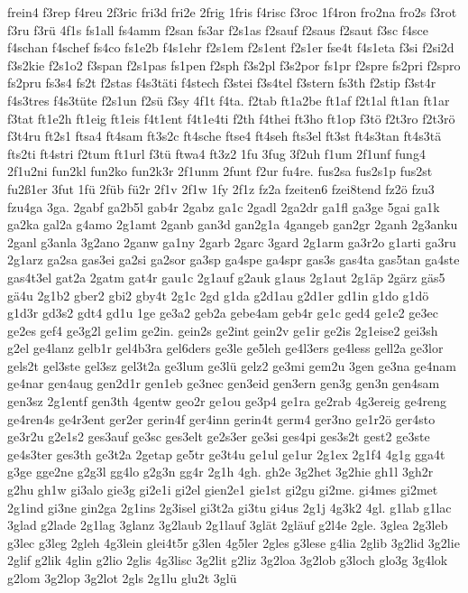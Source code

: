 {frein4
f3rep
f4reu
2f3ric
fri3d
fri2e
2frig
1fris
f4risc
f3roc
1f4ron
fro2na
fro2s
f3rot
f3ru
f3rü
4f1s
fs1all
fs4amm
f2san
fs3ar
f2s1as
f2sauf
f2saus
f2saut
f3sc
f4sce
f4schan
f4schef
fs4co
fs1e2b
f4s1ehr
f2s1em
f2s1ent
f2s1er
fse4t
f4s1eta
f3si
f2si2d
f3s2kie
f2s1o2
f3span
f2s1pas
fs1pen
f2sph
f3s2pl
f3s2por
fs1pr
f2spre
fs2pri
f2spro
fs2pru
fs3s4
fs2t
f2stas
f4s3täti
f4stech
f3stei
f3s4tel
f3stern
fs3th
f2stip
f3st4r
f4s3tres
f4s3tüte
f2s1un
f2sü
f3sy
4f1t
f4ta.
f2tab
ft1a2be
ft1af
f2t1al
ft1an
ft1ar
f3tat
ft1e2h
ft1eig
ft1eis
f4t1ent
f4t1e4ti
f2th
f4thei
ft3ho
ft1op
f3tö
f2t3ro
f2t3rö
f3t4ru
ft2s1
ftsa4
ft4sam
ft3s2c
ft4sche
ftse4
ft4seh
fts3el
ft3st
ft4s3tan
ft4s3tä
fts2ti
ft4stri
f2tum
ft1url
f3tü
ftwa4
ft3z2
1fu
3fug
3f2uh
f1um
2f1unf
fung4
2f1u2ni
fun2kl
fun2ko
fun2k3r
2f1unm
2funt
f2ur
fu4re.
fus2sa
fus2s1p
fus2st
fu2ß1er
3fut
1fü
2füb
fü2r
2f1v
2f1w
1fy
2f1z
fz2a
fzeiten6
fzei8tend
fz2ö
fzu3
fzu4ga
3ga.
2gabf
ga2b5l
gab4r
2gabz
ga1c
2gadl
2ga2dr
ga1fl
ga3ge
5gai
ga1k
ga2ka
gal2a
g4amo
2g1amt
2ganb
gan3d
gan2g1a
4gangeb
gan2gr
2ganh
2g3anku
2ganl
g3anla
3g2ano
2ganw
ga1ny
2garb
2garc
3gard
2g1arm
ga3r2o
g1arti
ga3ru
2g1arz
ga2sa
gas3ei
ga2si
ga2sor
ga3sp
ga4spe
ga4spr
gas3s
gas4ta
gas5tan
ga4ste
gas4t3el
gat2a
2gatm
gat4r
gau1c
2g1auf
g2auk
g1aus
2g1aut
2g1äp
2gärz
gäs5
gä4u
2g1b2
gber2
gbi2
gby4t
2g1c
2gd
g1da
g2d1au
g2d1er
gd1in
g1do
g1dö
g1d3r
gd3s2
gdt4
gd1u
1ge
ge3a2
geb2a
gebe4am
geb4r
ge1c
ged4
ge1e2
ge3ec
ge2es
gef4
ge3g2l
ge1im
ge2in.
gein2s
ge2int
gein2v
ge1ir
ge2is
2g1eise2
gei3sh
g2el
ge4lanz
gelb1r
gel4b3ra
gel6ders
ge3le
ge5leh
ge4l3ers
ge4less
gell2a
ge3lor
gels2t
gel3ste
gel3sz
gel3t2a
ge3lum
ge3lü
gelz2
ge3mi
gem2u
3gen
ge3na
ge4nam
ge4nar
gen4aug
gen2d1r
gen1eb
ge3nec
gen3eid
gen3ern
gen3g
gen3n
gen4sam
gen3sz
2g1entf
gen3th
4gentw
geo2r
ge1ou
ge3p4
ge1ra
ge2rab
4g3ereig
ge4reng
ge4ren4s
ge4r3ent
ger2er
gerin4f
ger4inn
gerin4t
germ4
ger3no
ge1r2ö
ger4sto
ge3r2u
g2e1s2
ges3auf
ge3sc
ges3elt
ge2s3er
ge3si
ges4pi
ges3s2t
gest2
ge3ste
ge4s3ter
ges3th
ge3t2a
2getap
ge5tr
ge3t4u
ge1ul
ge1ur
2g1ex
2g1f4
4g1g
gga4t
g3ge
gge2ne
g2g3l
gg4lo
g2g3n
gg4r
2g1h
4gh.
gh2e
3g2het
3g2hie
gh1l
3gh2r
g2hu
gh1w
gi3alo
gie3g
gi2e1i
gi2el
gien2e1
gie1st
gi2gu
gi2me.
gi4mes
gi2met
2g1ind
gi3ne
gin2ga
2g1ins
2g3isel
gi3t2a
gi3tu
gi4us
2g1j
4g3k2
4gl.
g1lab
g1lac
3glad
g2lade
2g1lag
3glanz
3g2laub
2g1lauf
3glät
2gläuf
g2l4e
2gle.
3glea
2g3leb
g3lec
g3leg
2gleh
4g3lein
glei4t5r
g3len
4g5ler
2gles
g3lese
g4lia
2glib
3g2lid
3g2lie
2glif
g2lik
4glin
g2lio
2glis
4g3lisc
3g2lit
g2liz
3g2loa
3g2lob
g3loch
glo3g
3g4lok
g2lom
3g2lop
3g2lot
2gls
2g1lu
glu2t
3glü
}

